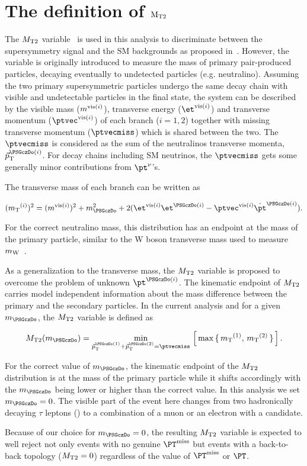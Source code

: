 \section{\texorpdfstring{The definition of $\rm {\ensuremath{{M_{\rm T2}}}}$}{The definition of MT2}}
\label{sect:mt2def}
The ${M_{\rm T2}}$ variable~\cite{Lester:1999tx,Barr:2003rg} is used in this analysis to discriminate between the supersymmetry signal and the SM backgrounds as proposed in~\cite{Barr:2009wu}. However, the variable is originally introduced to measure the mass of primary pair-produced particles, decaying eventually to undetected particles (e.g. neutralino). Assuming the two primary supersymmetric particles undergo the same decay chain with visible and undetectable particles in the final state, the system can be described by the visible mass ($m^{{\rm vis}(i)}$), transverse energy ($\etvisi$) and transverse momentum ($\vptvisi$) of each branch ($i=1,2$) together with missing transverse momentum ($\ptvecmiss$) which is shared between the two. The $\ptvecmiss$ is considered as the sum of the neutralinos transverse momenta, $\vec{p}_{\rm T}^{\PSGczDo(i)}$. For decay chains including SM neutrinos, the $\ptvecmiss$ gets some generally minor contributions from $\pt^{\nu}$'s.

The transverse mass of each branch can be written as 
\begin{linenomath}
\begin{equation}
\label{eq:mtdef}
(\mt^{(i)})^{2}= (\mvisi)^2+m^2_{\PSGczDo}+2(\etvisi\et^{\PSGczDo(i)}-\vptvisi\dot\pt^{\PSGczDo(i)}).
\end{equation}
\end{linenomath}
For the correct neutralino mass, this distribution has an endpoint at the mass of the primary particle, similar to the W boson transverse mass used to measure $m_{\rm W}$~\cite{Arnison:1983rp,Banner:1983jy,Affolder:2000bpa,Abazov:2002bu}. 

As a generalization to the transverse mass, the ${M_{\rm T2}}$ variable is proposed to overcome the problem of unknown $\pt^{\PSGczDo(i)}$. The kinematic endpoint of ${M_{\rm T2}}$ carries model independent information about the mass difference between the primary and the secondary particles. In the current analysis and for a given $m_{\PSGczDo}$, the ${M_{\rm T2}}$ variable is defined as
\begin{linenomath}
\begin{equation}
\label{eq:mt2def}
\mttwo(m_{\PSGczDo})= \min_{\vec{p}_{\rm T}^{\PSGczDo(1)}+\vec{p}_{\rm T}^{\PSGczDo(2)}=\ptvecmiss}\,\left[\,\max\,\{ \, \mt^{(1)},\,\mt^{(2)}\,\}\,\right].
\end{equation}
\end{linenomath}
For the correct value of $m_{\PSGczDo}$, the kinematic endpoint of the ${M_{\rm T2}}$ distribution is at the mass of the primary particle while it shifts accordingly with the $m_{\PSGczDo}$ being lower or higher than the correct value. In this analysis we set $m_{\PSGczDo}=0$. The visible part of the event here changes from two hadronically decaying $\tau$ leptons (\Tau) to a combination of a muon or an electron with a \Tau candidate. 

Because of our choice for $m_{\PSGczDo}=0$, the resulting ${M_{\rm T2}}$ variable is expected to well reject not only events with no genuine $\MPT$ but events with a back-to-back topology (${M_{\rm T2}}=0$) regardless of the value of $\MPT$ or $\PT$. 
